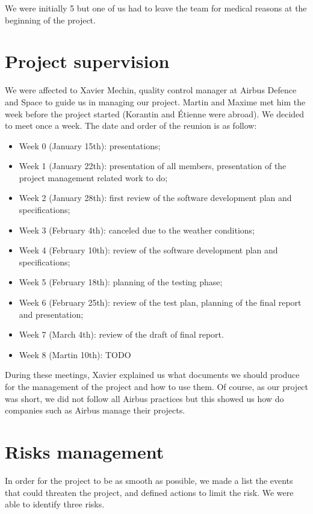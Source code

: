 \documentclass[openany, a4paper]{book}
\begin{document}
    We were initially 5 but one of us had to leave the team for medical reasons
    at the beginning of the project.

    \section{Project supervision}
      We were affected to Xavier Mechin, quality control manager at Airbus
      Defence and Space to guide us in managing our project. Martin and Maxime
      met him the week before the project started (Korantin and Étienne were
      abroad). We decided to meet once a week. The date and order of the reunion
      is as follow:

      \begin{itemize}
        \item Week 0 (January 15th): presentations;
        \item Week 1 (January 22th): presentation of all members, presentation
          of the project management related work to do;
        \item Week 2 (January 28th): first review of the software development
          plan and specifications;
        \item Week 3 (February 4th): canceled due to the weather conditions;
        \item Week 4 (February 10th): review of the software development plan
          and specifications;
        \item Week 5 (February 18th): planning of the testing phase;
        \item Week 6 (February 25th): review of the test plan, planning of the
          final report and presentation;
        \item Week 7 (March 4th): review of the draft of final report.
        \item Week 8 (Martin 10th): TODO
      \end{itemize}

      During these meetings, Xavier explained us what documents we should
      produce for the management of the project and how to use them. Of course,
      as our project was short, we did not follow all Airbus practices but this
      showed us how do companies such as Airbus manage their projects.

      \section{Risks management}
        In order for the project to be as smooth as possible, we made a list
        the events that could threaten the project, and defined actions to
        limit the risk. We were able to identify three risks.
\end{document}
